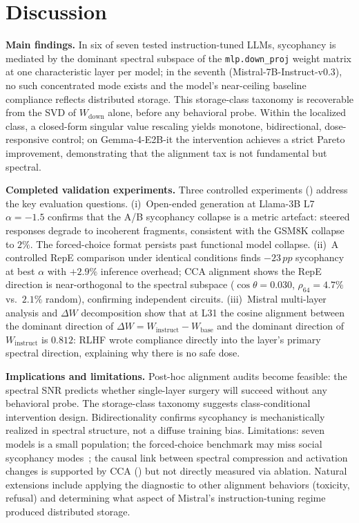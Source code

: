 \documentclass{article}
\newcommand{\pp}{\,pp}
\begin{document}
\section{Discussion}
\label{sec:discussion}

\textbf{Main findings.}
In six of seven tested instruction-tuned LLMs, sycophancy is mediated
by the dominant spectral subspace of the \texttt{mlp.down\_proj}
weight matrix at one characteristic layer per model; in the seventh
(Mistral-7B-Instruct-v0.3), no such concentrated mode exists and the
model's near-ceiling baseline compliance reflects distributed storage.
This storage-class taxonomy is recoverable from the SVD of
$W_\mathrm{down}$ alone, before any behavioral probe. Within the
localized class, a closed-form singular value rescaling yields
monotone, bidirectional, dose-responsive control; on Gemma-4-E2B-it
the intervention achieves a strict Pareto improvement, demonstrating
that the alignment tax is not fundamental but spectral.

\textbf{Completed validation experiments.}
Three controlled experiments ()
address the key evaluation questions. (i)~Open-ended generation at
Llama-3B L7 $\alpha{=}{-}1.5$ confirms that the A/B sycophancy
collapse is a metric artefact: steered responses degrade to incoherent
fragments, consistent with the GSM8K collapse to $2\%$. The forced-choice
format persists past functional model collapse.
(ii)~A controlled RepE comparison under identical conditions finds
$-23\pp$ sycophancy at best $\alpha$ with $+2.9\%$ inference overhead;
CCA alignment shows the RepE direction is near-orthogonal to the
spectral subspace ($\cos\theta{=}0.030$, $\rho_{64}{=}4.7\%$ vs.\ $2.1\%$
random), confirming independent circuits.
(iii)~Mistral multi-layer analysis and $\Delta W$ decomposition show
that at L31 the cosine alignment between the dominant direction of
$\Delta W{=}W_\mathrm{instruct}{-}W_\mathrm{base}$ and the dominant
direction of $W_\mathrm{instruct}$ is $0.812$: RLHF wrote compliance
directly into the layer's primary spectral direction, explaining why
there is no safe dose.

\textbf{Implications and limitations.}
Post-hoc alignment audits become feasible: the spectral SNR predicts
whether single-layer surgery will succeed without any behavioral probe.
The storage-class taxonomy suggests class-conditional intervention design.
Bidirectionality confirms sycophancy is mechanistically realized in
spectral structure, not a diffuse training bias.
Limitations: seven models is a small population; the forced-choice benchmark
may miss social sycophancy modes~\citep{chengELEPHANTSocialSycophancy2025};
the causal link between spectral compression and activation changes is
supported by CCA () but not directly measured via
ablation. Natural extensions include applying the diagnostic to other
alignment behaviors (toxicity, refusal) and determining what aspect of
Mistral's instruction-tuning regime produced distributed storage.
\end{document}

